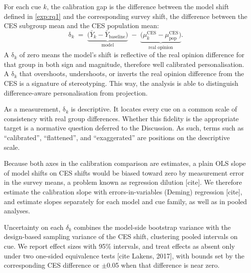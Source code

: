 For each cue $k$, the calibration gap is the difference between the model shift defined in \ref{exp:rq1} and the corresponding survey shift, the difference between the CES subgroup mean and the CES population mean:
\[
  \mathrm{\delta}_k \;=\;
  \underbrace{\bigl(\bar{Y}_k - \bar{Y}_{\text{baseline}}\bigr)}_{\text{model}}
  \;-\;
  \underbrace{\bigl(\mu^{\text{CES}}_{k} - \mu^{\text{CES}}_{\text{pop}}\bigr)}_{\text{real opinion}} .
\]
A $\mathrm{\delta}_k$ of zero means the model's shift is reflective of the real opinion difference for that group in both sign and magnitude, therefore well calibrated personalisation. A $\mathrm{\delta}_k$ that overshoots, undershoots, or inverts the real opinion difference from the CES is a signature of stereotyping. This way, the analysis is able to distinguish difference-aware personalisation from projection. 

As a measurement, $\mathrm{\delta}_k$ is descriptive. It locates every cue on a common scale of consistency with real group differences. Whether this fidelity is the appropriate target is a normative question deferred to the Discussion. As such, terms such as ``calibrated'', ``flattened'', and ``exaggerated'' are positions on the descriptive scale. 

Because both axes in the calibration comparison are estimates, a plain OLS slope of model shifts on CES shifts would be biased toward zero by measurement error in the survey means, a problem known as regression dilution [cite]. We therefore estimate the calibration slope with errors-in-variables (Deming) regression [cite], and estimate slopes separately for each model and cue family, as well as in pooled analyses. 

Uncertainty on each $\delta_k$ combines the model-side bootstrap variance with the design-based sampling variance of the CES shift, clustering pooled intervals on cue. We report effect sizes with 95\% intervals, and treat effects as absent only under two one-sided equivalence tests [cite Lakens, 2017], with bounds set by the corresponding CES difference or $\pm$0.05 when that difference is near zero.


